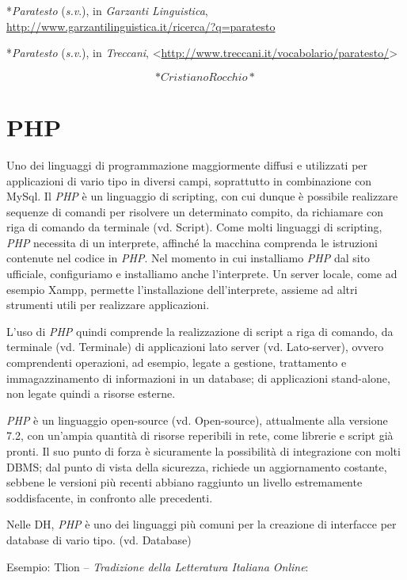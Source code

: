 \documentclass[
  b5paper,
  twoside,
  12pt,
  chapterprefix=false,
  bibliography=totocnumbered,
  parskip=false]{scrbook}
\begin{document}
*\emph{Paratesto} (\emph{s.v}.), in \emph{Garzanti Linguistica},
\url{http://www.garzantilinguistica.it/ricerca/?q=paratesto}

*\emph{Paratesto} (\emph{s.v}.), in \emph{Treccani},
\textless{}\href{http://www.treccani.it/vocabolario/paratesto/}{{http://www.treccani.it/vocabolario/paratesto/}}\textgreater{}

\[*Cristiano Rocchio*\]

\hypertarget{php}{%
\chapter{PHP}\label{php}}

Uno dei linguaggi di programmazione maggiormente diffusi e utilizzati
per applicazioni di vario tipo in diversi campi, soprattutto in
combinazione con MySql. Il \emph{PHP} è un linguaggio di scripting, con cui
dunque è possibile realizzare sequenze di comandi per risolvere un
determinato compito, da richiamare con riga di comando da terminale (vd.
Script). Come molti linguaggi di scripting, \emph{PHP} necessita di un
interprete, affinché la macchina comprenda le istruzioni contenute nel
codice in \emph{PHP}. Nel momento in cui installiamo \emph{PHP} dal sito
ufficiale, configuriamo e installiamo anche l'interprete. Un server
locale, come ad esempio Xampp, permette l'installazione dell'interprete,
assieme ad altri strumenti utili per realizzare applicazioni.

L'uso di \emph{PHP} quindi comprende la realizzazione di script a riga di
comando, da terminale (vd. Terminale) di applicazioni lato server (vd.
Lato-server), ovvero comprendenti operazioni, ad esempio, legate a
gestione, trattamento e immagazzinamento di informazioni in un database;
di applicazioni stand-alone, non legate quindi a risorse esterne.

\emph{PHP} è un linguaggio open-source (vd. Open-source), attualmente alla
versione 7.2, con un'ampia quantità di risorse reperibili in rete, come
librerie e script già pronti. Il suo punto di forza è sicuramente la
possibilità di integrazione con molti DBMS; dal punto di vista della
sicurezza, richiede un aggiornamento costante, sebbene le versioni più
recenti abbiano raggiunto un livello estremamente soddisfacente, in
confronto alle precedenti.

Nelle DH, \emph{PHP} è uno dei linguaggi più comuni per la creazione di
interfacce per database di vario tipo. (vd. Database)

Esempio: Tlion -- \emph{Tradizione della Letteratura Italiana Online}:
\end{document}
